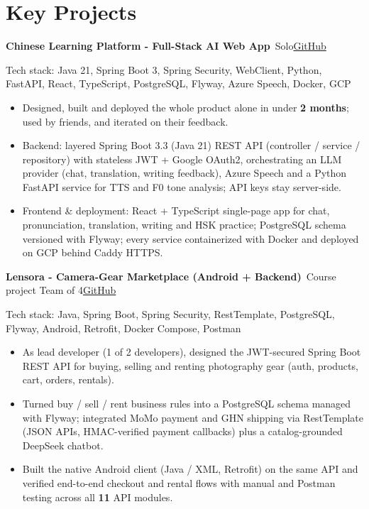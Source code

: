 \documentclass[10pt, a4paper]{article}
\newcommand{\project}[3]{\textbf{#1}\,{\color{MutedText}\textbar{} #2}\hfill\href{#3}{GitHub}\par}
\newcommand{\techstack}[1]{{\color{MutedText}Tech stack: #1}\par}
\begin{document}
\section{Key Projects}
\project{Chinese Learning Platform - Full-Stack AI Web App}{Solo}{https://github.com/minhphuong150505/Web_Chinese_Learning-}
\techstack{Java 21, Spring Boot 3, Spring Security, WebClient, Python, FastAPI, React, TypeScript, PostgreSQL, Flyway, Azure Speech, Docker, GCP}
\begin{itemize}
  \item Designed, built and deployed the whole product alone in under \textbf{2 months}; used by friends, and iterated on their feedback.
  \item Backend: layered Spring Boot 3.3 (Java 21) REST API (controller / service / repository) with stateless JWT + Google OAuth2, orchestrating an LLM provider (chat, translation, writing feedback), Azure Speech and a Python FastAPI service for TTS and F0 tone analysis; API keys stay server-side.
  \item Frontend \& deployment: React + TypeScript single-page app for chat, pronunciation, translation, writing and HSK practice; PostgreSQL schema versioned with Flyway; every service containerized with Docker and deployed on GCP behind Caddy HTTPS.
\end{itemize}
\vspace{2pt}
\project{Lensora - Camera-Gear Marketplace (Android + Backend)}{Course project \textbullet{} Team of 4}{https://github.com/minhphuong150505/Lensora}
\techstack{Java, Spring Boot, Spring Security, RestTemplate, PostgreSQL, Flyway, Android, Retrofit, Docker Compose, Postman}
\begin{itemize}
  \item As lead developer (1 of 2 developers), designed the JWT-secured Spring Boot REST API for buying, selling and renting photography gear (auth, products, cart, orders, rentals).
  \item Turned buy / sell / rent business rules into a PostgreSQL schema managed with Flyway; integrated MoMo payment and GHN shipping via RestTemplate (JSON APIs, HMAC-verified payment callbacks) plus a catalog-grounded DeepSeek chatbot.
  \item Built the native Android client (Java / XML, Retrofit) on the same API and verified end-to-end checkout and rental flows with manual and Postman testing across all \textbf{11} API modules.
\end{itemize}
\vspace{2pt}
\end{document}
